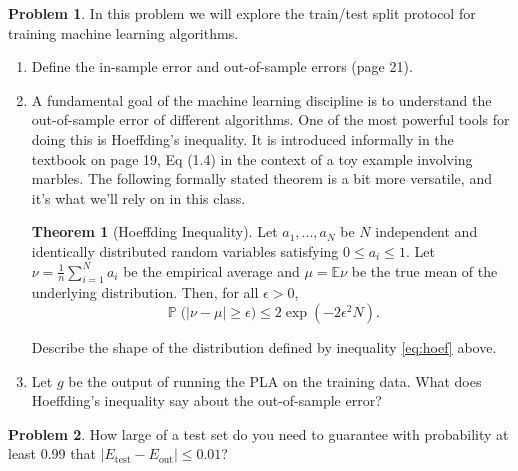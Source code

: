 \documentclass[10pt]{exam}
\theoremstyle{definition}
\newtheorem{problem}{Problem}
\newtheorem{theorem}{Theorem}
\newcommand{\E}{\mathbb E}
\DeclareMathOperator{\prob}{\mathbb P}
\newcommand{\Eout}{E_{\text{out}}}
\newcommand{\Etest}{E_{\text{test}}}
\begin{document}
\newpage
\begin{problem}
    In this problem we will explore the train/test split protocol for training machine learning algorithms.
    \begin{enumerate}
        \item Define the in-sample error and out-of-sample errors (page 21).
            \vspace{3in}
        \item A fundamental goal of the machine learning discipline is to understand the out-of-sample error of different algorithms.
            One of the most powerful tools for doing this is Hoeffding's inequality.
            It is introduced informally in the textbook on page 19, Eq (1.4) in the context of a toy example involving marbles.
            The following formally stated theorem is a bit more versatile, and it's what we'll rely on in this class.
            \begin{theorem}[Hoeffding Inequality]
                Let $a_1, ..., a_N$ be $N$ independent and identically distributed random variables satisfying $0 \le a_i \le 1$.
                Let $\nu = \tfrac1n\sum_{i=1}^N a_i$ be the empirical average and $\mu = \E \nu$ be the true mean of the underlying distribution.
                Then, for all $\epsilon > 0$,
                \begin{equation}
                    \label{eq:hoef}
                    \prob\big(|\nu - \mu| \ge \epsilon\big)
                    \le 
                    2 \exp (-2\epsilon^2 N)
                    .
                \end{equation}
            \end{theorem}
            Describe the shape of the distribution defined by inequality \ref{eq:hoef} above.

        \newpage
        \item Let $g$ be the output of running the PLA on the training data.
            What does Hoeffding's inequality say about the out-of-sample error?
            \vspace{6in}


    \end{enumerate}
\end{problem}
\newpage
\begin{problem}
    How large of a test set do you need to guarantee with probability at least 0.99 that $|\Etest-\Eout| \le 0.01$?
\end{problem}
\end{document}
